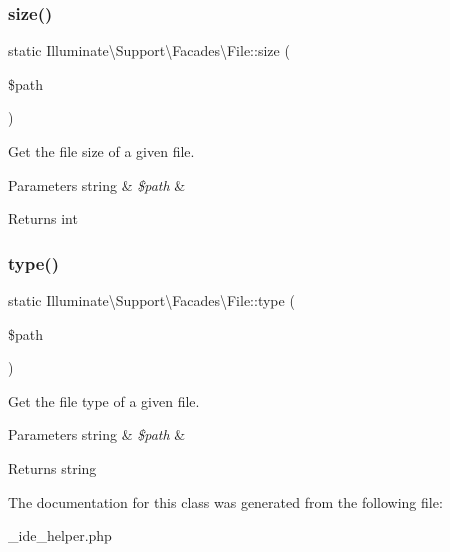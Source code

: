 \subsubsection{\texorpdfstring{size()}{size()}}
{\footnotesize\ttfamily static Illuminate\textbackslash{}\+Support\textbackslash{}\+Facades\textbackslash{}\+File\+::size (\begin{DoxyParamCaption}\item[{}]{\$path }\end{DoxyParamCaption})\hspace{0.3cm}{\ttfamily [static]}}

Get the file size of a given file.


\begin{DoxyParams}[1]{Parameters}
string & {\em \$path} & \\
\hline
\end{DoxyParams}
\begin{DoxyReturn}{Returns}
int 
\end{DoxyReturn}
\mbox{\label{class_illuminate_1_1_support_1_1_facades_1_1_file_ab77fa1f772bbe857afb6f436af2aaf3f}} 
\subsubsection{\texorpdfstring{type()}{type()}}
{\footnotesize\ttfamily static Illuminate\textbackslash{}\+Support\textbackslash{}\+Facades\textbackslash{}\+File\+::type (\begin{DoxyParamCaption}\item[{}]{\$path }\end{DoxyParamCaption})\hspace{0.3cm}{\ttfamily [static]}}

Get the file type of a given file.


\begin{DoxyParams}[1]{Parameters}
string & {\em \$path} & \\
\hline
\end{DoxyParams}
\begin{DoxyReturn}{Returns}
string 
\end{DoxyReturn}


The documentation for this class was generated from the following file\+:\begin{DoxyCompactItemize}
\item 
\+\_\+ide\+\_\+helper.\+php\end{DoxyCompactItemize}
